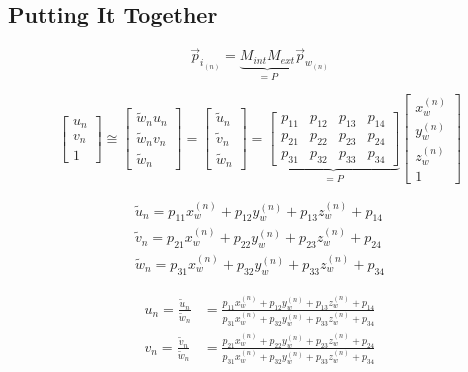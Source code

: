 \subsection{Putting It Together}
\begin{equation}
    \vec{p}_{i_{(n)}} = \underbrace{M_{int}M_{ext}}_{=P}\vec{p}_{w_{(n)}}
\end{equation}

\begin{equation}
    \begin{bmatrix}
        u_n \\ v_n \\ 1
    \end{bmatrix}
    \cong
    \begin{bmatrix}
        \widetilde{w}_n u_n \\ \widetilde{w}_n v_n \\ \widetilde{w}_n
    \end{bmatrix}
    =
    \begin{bmatrix}
        \widetilde{u}_n \\ \widetilde{v}_n \\ \widetilde{w}_n
    \end{bmatrix}
    =
    \underbrace{
        \begin{bmatrix}
            p_{11} & p_{12} & p_{13} & p_{14} \\
            p_{21} & p_{22} & p_{23} & p_{24} \\
            p_{31} & p_{32} & p_{33} & p_{34}
        \end{bmatrix}
    }_{=P}
    \begin{bmatrix}
        x_w^{(n)} \\ y_w^{(n)} \\ z_w^{(n)} \\ 1
    \end{bmatrix}
\end{equation}

\begin{align}
        \widetilde{u}_n = p_{11}x_w^{(n)} + p_{12}y_w^{(n)} + p_{13}z_w^{(n)} + p_{14} \\
        \widetilde{v}_n = p_{21}x_w^{(n)} + p_{22}y_w^{(n)} + p_{23}z_w^{(n)} + p_{24} \\
        \widetilde{w}_n = p_{31}x_w^{(n)} + p_{32}y_w^{(n)} + p_{33}z_w^{(n)} + p_{34}
\end{align}


\begin{align}
    u_n = \frac{\widetilde{u}_n}{\widetilde{w}_n} & = \frac{p_{11}x_w^{(n)} + p_{12}y_w^{(n)} + p_{13}z_w^{(n)} + p_{14}}{p_{31}x_w^{(n)} + p_{32}y_w^{(n)} + p_{33}z_w^{(n)} + p_{34}} \\
    v_n = \frac{\widetilde{v}_n}{\widetilde{w}_n} & = \frac{p_{21}x_w^{(n)} + p_{22}y_w^{(n)} + p_{23}z_w^{(n)} + p_{24}}{p_{31}x_w^{(n)} + p_{32}y_w^{(n)} + p_{33}z_w^{(n)} + p_{34}}
\end{align}

